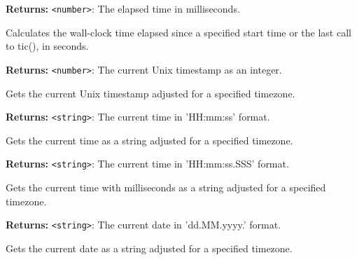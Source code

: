 \documentclass[12pt,a4paper]{article}
\begin{document}
\noindent \textbf{Returns:} \texttt{<number>}: The elapsed time in milliseconds.

\noindent Calculates the wall-clock time elapsed since a specified start time or the last call to \textasciigrave{}tic()\textasciigrave{}, in seconds.

\vspace{5mm}
\noindent {}


\noindent \textbf{Returns:} \texttt{<number>}: The current Unix timestamp as an integer.

\noindent Gets the current Unix timestamp adjusted for a specified timezone.

\vspace{5mm}
\noindent {}


\noindent \textbf{Returns:} \texttt{<string>}: The current time in 'HH:mm:ss' format.

\noindent Gets the current time as a string adjusted for a specified timezone.

\vspace{5mm}
\noindent {}


\noindent \textbf{Returns:} \texttt{<string>}: The current time in 'HH:mm:ss.SSS' format.

\noindent Gets the current time with milliseconds as a string adjusted for a specified timezone.

\vspace{5mm}
\noindent {}


\noindent \textbf{Returns:} \texttt{<string>}: The current date in 'dd.MM.yyyy.' format.

\noindent Gets the current date as a string adjusted for a specified timezone.

\vspace{5mm}
\noindent {}
\end{document}
